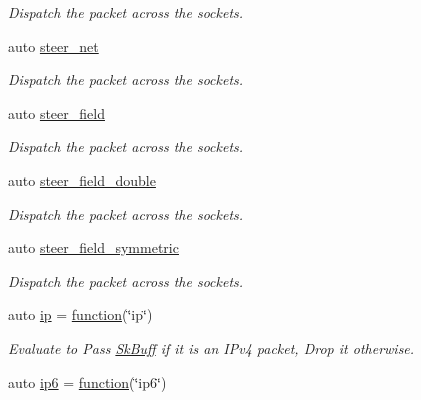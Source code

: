 \begin{DoxyCompactItemize}
\begin{DoxyCompactList}\small\item\em Dispatch the packet across the sockets. \end{DoxyCompactList}\item 
auto \hyperlink{namespacepfq_1_1lang_1_1anonymous__namespace_02default_8hpp_03_a6f8d514e40bb2b0e874fb26d2b416dc3}{steer\+\_\+net}
\begin{DoxyCompactList}\small\item\em Dispatch the packet across the sockets. \end{DoxyCompactList}\item 
auto \hyperlink{namespacepfq_1_1lang_1_1anonymous__namespace_02default_8hpp_03_ad861e297a10876e534c5c9053ec23999}{steer\+\_\+field}
\begin{DoxyCompactList}\small\item\em Dispatch the packet across the sockets. \end{DoxyCompactList}\item 
auto \hyperlink{namespacepfq_1_1lang_1_1anonymous__namespace_02default_8hpp_03_aabbf7feb753f3c5b1b40cfa8a54581e5}{steer\+\_\+field\+\_\+double}
\begin{DoxyCompactList}\small\item\em Dispatch the packet across the sockets. \end{DoxyCompactList}\item 
auto \hyperlink{namespacepfq_1_1lang_1_1anonymous__namespace_02default_8hpp_03_a422c7bafe8240549d193903890f9ec48}{steer\+\_\+field\+\_\+symmetric}
\begin{DoxyCompactList}\small\item\em Dispatch the packet across the sockets. \end{DoxyCompactList}\item 
auto \hyperlink{namespacepfq_1_1lang_1_1anonymous__namespace_02default_8hpp_03_a738d1b52bf88feb4f7b1a17b97cdc8df}{ip} = \hyperlink{namespacepfq_1_1lang_a1a4638059d700ae08d0ca63886ff2bb3}{function}(\char`\"{}ip\char`\"{})
\begin{DoxyCompactList}\small\item\em Evaluate to {\ttfamily Pass} \hyperlink{structpfq_1_1lang_1_1SkBuff}{Sk\+Buff} if it is an I\+Pv4 packet, {\ttfamily Drop} it otherwise. \end{DoxyCompactList}\item 
auto \hyperlink{namespacepfq_1_1lang_1_1anonymous__namespace_02default_8hpp_03_a5df1535f3c8090b714928b77f5a9cf18}{ip6} = \hyperlink{namespacepfq_1_1lang_a1a4638059d700ae08d0ca63886ff2bb3}{function}(\char`\"{}ip6\char`\"{})

\end{DoxyCompactItemize}
